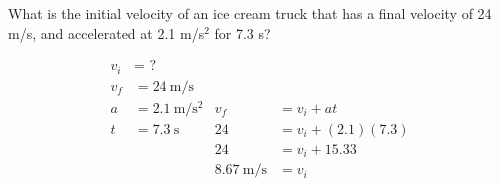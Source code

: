 \documentclass[10pt]{exam}
\begin{document}
\begin{questions}
  \question
    What is the initial velocity of an ice cream truck that has a final velocity of 24 m/s, and accelerated at 2.1 m/s$^2$ for 7.3 s?
    

    \begin{solution}[\stretch{1}]
      \begin{align*}
        v_i &= \text{ ?}     \\
        v_f &= \SI{24}{\meter\per\second} \\
        a   &= \SI{2.1}{\meter\per\second^2} & 
                              v_f &= v_i + at \\
        t &= \SI{7.3}{\second} & 
                              24  &= v_i + (2.1)(7.3) \\
        &&                    24  &= v_i + 15.33 \\
        &&  \SI{8.67}{\meter\per\second} &= v_i 
      \end{align*}
    \end{solution}



\end{questions}
\end{document}
